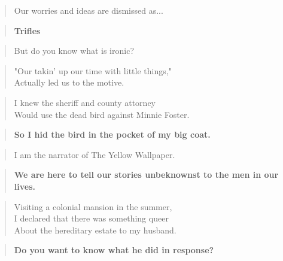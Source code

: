 \documentclass[twocolumn]{article}
\begin{document}
\begin{verse}
Our worries and ideas are dismissed as... \\
\end{verse}

\begin{verse}
\textbf{Trifles} \\
\end{verse}

\begin{verse}
But do you know what is ironic? \\
\end{verse}

\begin{verse}
"Our takin' up our time with little things," \\
Actually led us to the motive. \\
\end{verse}

\begin{verse}
I knew the sheriff and county attorney \\
Would use the dead bird against Minnie Foster. \\
\end{verse}

\begin{verse}
\textbf{So I hid the bird in the pocket of my big coat.} \\
\end{verse}
\newpage{}
\begin{verse}
I am the narrator of The Yellow Wallpaper.
\end{verse}

\begin{verse}
\textbf{We are here to tell our stories unbeknownst to the men in our lives. }
\end{verse}

\begin{verse}
Visiting a colonial mansion in the summer, \\
I declared that there was something queer \\
About the hereditary estate to my husband. \\
\end{verse}

\begin{verse}
\textbf{Do you want to know what he did in response?} \\
\end{verse}
\end{document}
